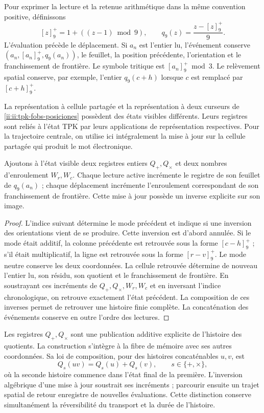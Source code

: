 Pour exprimer la lecture et la retenue arithmétique dans la même convention positive,
définissons
\[
 [z]^+_9=1+((z-1)\bmod9),\qquad
 q_9(z)=\frac{z-[z]^+_9}{9}.
\]
L'évaluation précède le déplacement. Si \(a_n\) est l'entier
lu, l'événement conserve \((a_n,[a_n]^+_9,q_9(a_n))\), le feuillet,
la position précédente, l'orientation et le franchissement de frontière. Le
symbole tritique est \([a_n]^+_9\bmod3\). Le relèvement spatial
conserve, par exemple, l'entier
\(q_9(c+h)\) lorsque \(c\) est remplacé par \([c+h]^+_9\).

La représentation à cellule partagée et la représentation à deux
curseurs de \eqref{ii:ii:tpk-fobs-posiciones} possèdent des états visibles
différents. Leurs registres sont reliés à l'état TPK par
leurs applications de représentation respectives. Pour la trajectoire centrale,
on utilise ici intégralement la mise à jour sur la cellule
partagée qui produit le mot électronique.

\begin{proposition}
\label{ii:ii:electron-inversa-cocientes}
Ajoutons à l'état visible deux registres entiers \(Q_+,Q_\times\)
et deux nombres d'enroulement \(W_r,W_c\). Chaque lecture active
incrémente le registre de son feuillet de \(q_9(a_n)\) ; chaque déplacement
incrémente l'enroulement correspondant de son franchissement de frontière.
Cette mise à jour possède un inverse explicite sur son image.
\end{proposition}
\begin{proof}
L'indice suivant détermine le mode précédent et indique si une inversion
des orientations vient de se produire. Cette inversion est d'abord annulée.
Si le mode était additif, la colonne précédente est retrouvée sous la forme
\([c-h]^+_9\) ; s'il était multiplicatif, la ligne est retrouvée sous la forme
\([r-v]^+_9\). Le mode neutre conserve les deux coordonnées. La cellule
retrouvée détermine de nouveau l'entier lu, son résidu, son
quotient et le franchissement de frontière. En soustrayant ces incréments de
\(Q_+,Q_\times,W_r,W_c\) et en inversant l'indice chronologique, on
retrouve exactement l'état précédent. La composition de ces
inverses permet de retrouver une histoire finie complète. La concaténation des
événements conserve en outre l'ordre des lectures.
\end{proof}

Les registres \(Q_+,Q_\times\) sont une publication additive explicite
de l'histoire des quotients. La construction s'intègre à la fibre
de mémoire avec ses autres coordonnées. Sa loi de composition,
pour des histoires concaténables \(u,v\), est
\[
 Q_s(uv)=Q_s(u)+Q_s(v),\qquad s\in\{+,\times\},
\]
où la seconde histoire commence dans l'état final de la première.
L'inversion algébrique d'une mise à jour soustrait ses incréments ;
parcourir ensuite un trajet spatial de retour enregistre
de nouvelles évaluations. Cette distinction conserve simultanément la
réversibilité du transport et la durée de l'histoire.

